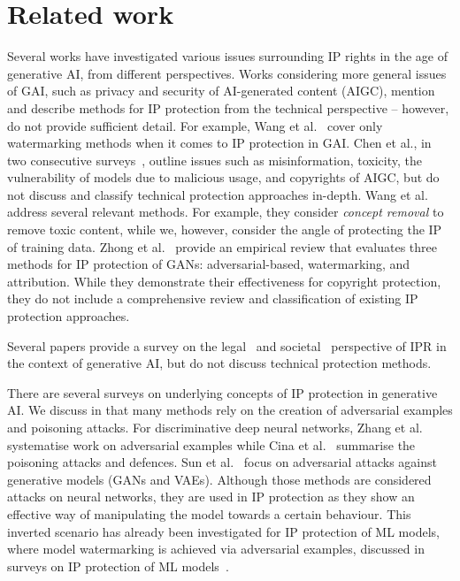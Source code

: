 \documentclass[conference,table]{IEEEtran} %
\begin{document}
\section{Related work}\label{sec:related-work}
Several works have investigated various issues surrounding IP rights in the age of generative AI, from different perspectives.
Works considering more general issues of GAI, such as privacy and security of AI-generated content (AIGC), mention and describe methods for IP protection from the technical perspective -- however, do not provide sufficient detail. For example, Wang et al.~\cite{wang_survey_2023} cover only watermarking methods when it comes to IP protection in GAI. Chen et al., in two consecutive surveys~\cite{chen_challenges_2023,chen_pathway_2023}, outline issues such as misinformation, toxicity, the vulnerability of models due to malicious usage, and copyrights of AIGC, but do not discuss and classify technical protection approaches in-depth.
Wang et al.~\cite{wang_security_2023} address several relevant methods. For example, they consider \textit{concept removal} to remove toxic content, while we, however, consider the angle of protecting the IP of training data.
Zhong et al.~\cite{zhong_copyright_2023} provide an empirical review that evaluates three methods for IP protection of GANs: adversarial-based, watermarking, and attribution. While they demonstrate their effectiveness for copyright protection, they do not include a comprehensive review and classification of existing IP protection approaches. 

Several papers provide a survey on the legal~\cite{smits_generative_2022,chesterman_good_2023} and societal~\cite{hristov_artificial_2020} perspective of IPR in the context of generative AI, but do not discuss technical protection methods. 

There are several surveys on underlying concepts of IP protection in generative AI. We discuss in  that many methods rely on the creation of adversarial examples and poisoning attacks. 
For discriminative deep neural networks, Zhang et al.~\cite{zhang_adversarial_2019} systematise work on adversarial examples while Cina et al.~\cite{cina_wild_2023} summarise the poisoning attacks and defences.
Sun et al.~\cite{sun_adversarial_2023} focus on adversarial attacks against generative models (GANs and VAEs).
Although those methods are considered attacks on neural networks, they are used in IP protection as they show an effective way of manipulating the model towards a certain behaviour. 
This inverted scenario has already been investigated for IP protection of ML models, where model watermarking is achieved via adversarial examples, discussed in surveys on IP protection of ML models~\cite{lederer_identifying_2023,regazzoni_protecting_2021,boenisch_systematic_2021}.
\end{document}
